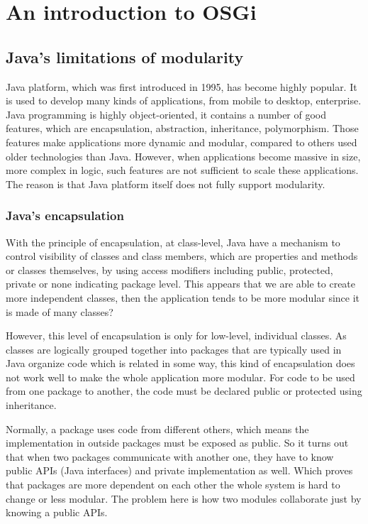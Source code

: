 \chapter{An introduction to OSGi}


\section{Java's limitations of modularity}
Java platform, which was first introduced in 1995, has become highly popular. It is used to develop many kinds of applications, from mobile to desktop, enterprise. Java programming is highly object-oriented, it contains a number of good features, which are encapsulation, abstraction, inheritance, polymorphism. Those features make applications more dynamic and modular, compared to others used older technologies than Java. However, when applications become massive in size, more complex in logic, such features are not sufficient to scale these applications. The reason is that Java platform itself does not fully support modularity.

\subsection{Java's encapsulation}
With the principle of encapsulation, at class-level, Java have a mechanism to control visibility of classes and class members, which are properties and methods or classes themselves, by using access modifiers including public, protected, private or none indicating package level. This appears that we are able to create more independent classes, then the application tends to be more modular since it is made of many classes?

However, this level of encapsulation is only for low-level, individual classes. As classes are logically grouped together into packages that are typically used in Java organize code which is related in some way, this kind of encapsulation does not work well to make the whole application more modular. For code to be used from one package to another, the code must be declared public or protected using inheritance. 

Normally, a package uses code from different others, which means the implementation in outside packages must be exposed as public. So it turns out that when two packages communicate with another one, they have to know public APIs (Java interfaces) and private implementation as well. Which proves that packages are more dependent on each other the whole system is hard to change or less modular. The problem here is how two modules collaborate just by knowing a public APIs.

